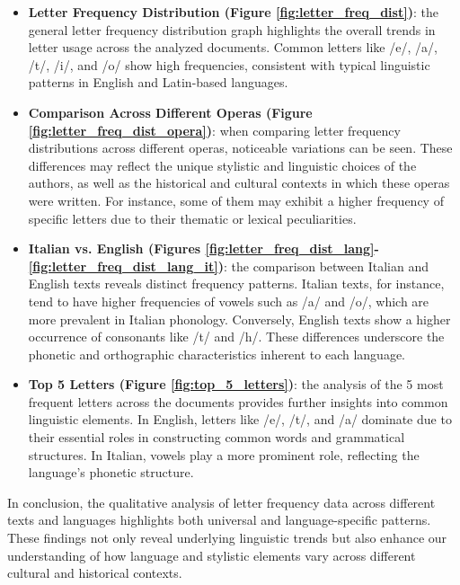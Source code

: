 \begin{itemize}
\item \textbf{Letter Frequency Distribution (Figure \ref{fig:letter_freq_dist})}: the general letter frequency distribution graph highlights the overall trends in letter usage across the analyzed documents. Common letters like /e/, /a/, /t/, /i/, and /o/ show high frequencies, consistent with typical linguistic patterns in English and Latin-based languages.

\item \textbf{Comparison Across Different Operas (Figure \ref{fig:letter_freq_dist_opera})}: when comparing letter frequency distributions across different operas, noticeable variations can be seen. These differences may reflect the unique stylistic and linguistic choices of the authors, as well as the historical and cultural contexts in which these operas were written. For instance, some of them may exhibit a higher frequency of specific letters due to their thematic or lexical peculiarities.

\item \textbf{Italian vs. English (Figures \ref{fig:letter_freq_dist_lang}-\ref{fig:letter_freq_dist_lang_it})}: the comparison between Italian and English texts reveals distinct frequency patterns. Italian texts, for instance, tend to have higher frequencies of vowels such as /a/ and /o/, which are more prevalent in Italian phonology. Conversely, English texts show a higher occurrence of consonants like /t/ and /h/. These differences underscore the phonetic and orthographic characteristics inherent to each language.

\item \textbf{Top 5 Letters (Figure \ref{fig:top_5_letters})}: the analysis of the 5 most frequent letters across the documents provides further insights into common linguistic elements. In English, letters like /e/, /t/, and /a/ dominate due to their essential roles in constructing common words and grammatical structures. In Italian, vowels play a more prominent role, reflecting the language's phonetic structure.

\end{itemize}

\noindent In conclusion, the qualitative analysis of letter frequency data across different texts and languages highlights both universal and language-specific patterns. These findings not only reveal underlying linguistic trends but also enhance our understanding of how language and stylistic elements vary across different cultural and historical contexts.
